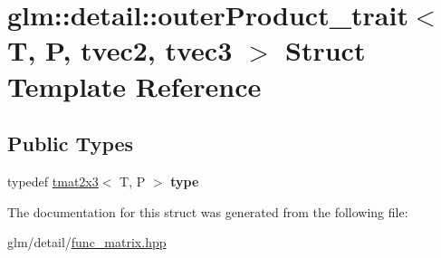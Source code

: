 \hypertarget{structglm_1_1detail_1_1outerProduct__trait_3_01T_00_01P_00_01tvec2_00_01tvec3_01_4}{\section{glm\-:\-:detail\-:\-:outer\-Product\-\_\-trait$<$ T, P, tvec2, tvec3 $>$ Struct Template Reference}
\label{structglm_1_1detail_1_1outerProduct__trait_3_01T_00_01P_00_01tvec2_00_01tvec3_01_4}
}
\subsection*{Public Types}
\begin{DoxyCompactItemize}
\item 
\hypertarget{structglm_1_1detail_1_1outerProduct__trait_3_01T_00_01P_00_01tvec2_00_01tvec3_01_4_a960af058d12b8de3d79562804f768d0d}{typedef \hyperlink{structglm_1_1tmat2x3}{tmat2x3}$<$ T, P $>$ {\bfseries type}}\label{structglm_1_1detail_1_1outerProduct__trait_3_01T_00_01P_00_01tvec2_00_01tvec3_01_4_a960af058d12b8de3d79562804f768d0d}

\end{DoxyCompactItemize}


The documentation for this struct was generated from the following file\-:\begin{DoxyCompactItemize}
\item 
glm/detail/\hyperlink{func__matrix_8hpp}{func\-\_\-matrix.\-hpp}\end{DoxyCompactItemize}
